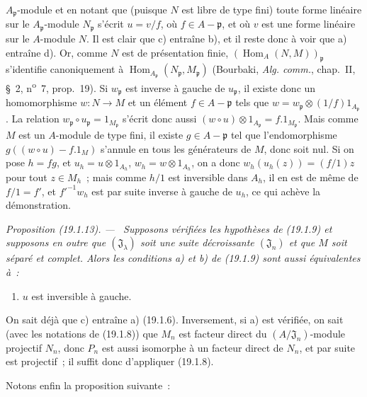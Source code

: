 \documentclass[10pt,oneside]{book}
\makeatletter
\newcommand{\setmanualcurrentlabel}[1]{\def\@currentlabel{#1}}
\newenvironment{proposition}[1][]{%
  \setmanualcurrentlabel{#1}\par\medskip\noindent\itshape Proposition (#1). ---\ }{\par}
\makeatother
\begin{document}
$A_{\mathfrak p}$-module et en notant que (puisque $N$ est libre de type fini)
toute forme linéaire sur le $A_{\mathfrak p}$-module $N_{\mathfrak p}$ s'écrit
$u=v/f$, où $f\in A-\mathfrak p$, et où $v$ est une forme linéaire sur le
$A$-module $N$. Il est clair que c) entraîne b), et il reste donc à voir que a)
entraîne d). Or, comme $N$ est de présentation finie,
$(\operatorname{Hom}_A(N,M))_{\mathfrak p}$ s'identifie canoniquement à
$\operatorname{Hom}_{A_{\mathfrak p}}(N_{\mathfrak p},M_{\mathfrak p})$
(Bourbaki, \emph{Alg. comm.}, chap.~II, §~2, n\textsuperscript{o}~7,
prop.~19). Si $w_{\mathfrak p}$ est inverse à gauche de $u_{\mathfrak p}$, il
existe donc un homomorphisme $w:N\to M$ et un élément $f\in A-\mathfrak p$
tels que $w=w_{\mathfrak p}\otimes(1/f)1_{A_{\mathfrak p}}$. La relation
$w_{\mathfrak p}\circ u_{\mathfrak p}=1_{M_{\mathfrak p}}$ s'écrit donc aussi
$(w\circ u)\otimes1_{A_{\mathfrak p}}=f.1_{M_{\mathfrak p}}$. Mais comme $M$
est un $A$-module de type fini, il existe $g\in A-\mathfrak p$ tel que
l'endomorphisme $g((w\circ u)-f.1_M)$ s'annule en tous les générateurs de $M$,
donc soit nul. Si on pose $h=fg$, et
$u_h=u\otimes1_{A_h}$, $w_h=w\otimes1_{A_h}$, on a donc
$w_h(u_h(z))=(f/1)z$ pour tout $z\in M_h$~; mais comme $h/1$ est inversible
dans $A_h$, il en est de même de $f/1=f'$, et $f'^{-1}w_h$ est par suite
inverse à gauche de $u_h$, ce qui achève la démonstration.

\begin{proposition}[19.1.13]
\label{0.19.1.13-fr}
Supposons vérifiées les hypothèses de (19.1.9) et supposons en outre que
$(\mathfrak J_\lambda)$ soit une suite décroissante $(\mathfrak J_n)$ et que
$M$ soit séparé et complet. Alors les conditions a) et b) de (19.1.9) sont
aussi équivalentes à~:
\begin{enumerate}
  \item[c)] $u$ est inversible à gauche.
\end{enumerate}
\end{proposition}

On sait déjà que c) entraîne a) (19.1.6). Inversement, si a) est vérifiée, on
sait (avec les notations de (19.1.8)) que $M_n$ est facteur direct du
$(A/\mathfrak J_n)$-module projectif $N_n$, donc $P_n$ est aussi isomorphe à
un facteur direct de $N_n$, et par suite est projectif~; il suffit donc
d'appliquer (19.1.8).

Notons enfin la proposition suivante~:
\end{document}
